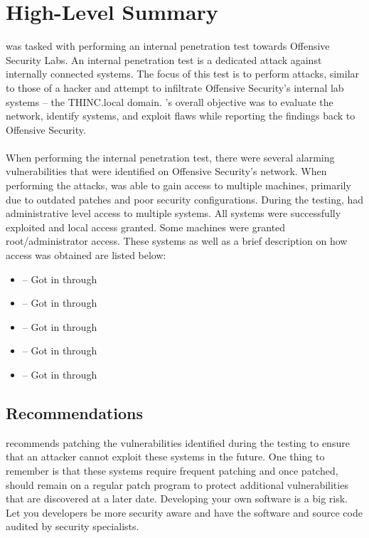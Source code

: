 \section{High-Level Summary}
{\fullname} was tasked with performing an internal penetration test towards Offensive Security Labs.
An internal penetration test is a dedicated attack against internally connected systems. The focus of this
test is to perform attacks, similar to those of a hacker and attempt to infiltrate Offensive Security’s
internal lab systems – the THINC.local domain. \firstname’s overall objective was to evaluate the network,
identify systems, and exploit flaws while reporting the findings back to Offensive Security.
\\\\
When performing the internal penetration test, there were several alarming vulnerabilities that were
identified on Offensive Security’s network. When performing the attacks, {\firstname} was able to gain access
to multiple machines, primarily due to outdated patches and poor security configurations. During the
testing, {\firstname} had administrative level access to multiple systems. All systems were successfully
exploited and local access granted. Some machines were granted root/administrator access. These
systems as well as a brief description on how access was obtained are listed below:

\begin{itemize}
\item \ipA – Got in through \vulnxA
\ifdefined\gotB\item \ipB – Got in through \vulnxB
\ifdefined\gotC
\item \ipC – Got in through \vulnxC
\ifdefined\gotD
\item \ipD – Got in through \vulnxD
\ifdefined\gotE
\item \ipE – Got in through \vulnxE
\fi
\fi
\fi
\fi
\end{itemize}

\subsection{Recommendations}
{\firstname} recommends patching the vulnerabilities identified during the testing to ensure that an attacker
cannot exploit these systems in the future. One thing to remember is that these systems require
frequent patching and once patched, should remain on a regular patch program to protect additional
vulnerabilities that are discovered at a later date. Developing your own software is a big risk. Let you
developers be more security aware and have the software and source code audited by security
specialists.

